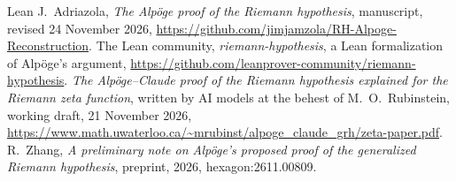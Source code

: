 \documentclass[reqno]{amsart}
\theoremstyle{definition}
\theoremstyle{plain}
\begin{document}
\begin{thebibliography}{Lean}
 J.~Adriazola, \emph{The Alp\"oge proof of the Riemann hypothesis}, manuscript, revised 24 November 2026, \url{https://github.com/jimjamzola/RH-Alpoge-Reconstruction}.
 The Lean community, \emph{riemann-hypothesis}, a Lean formalization of Alp\"oge's argument, \url{https://github.com/leanprover-community/riemann-hypothesis}.
 \emph{The Alp\"oge--Claude proof of the Riemann hypothesis explained for the Riemann zeta function}, written by AI models at the behest of M.~O.~Rubinstein, working draft, 21 November 2026, \url{https://www.math.uwaterloo.ca/~mrubinst/alpoge_claude_grh/zeta-paper.pdf}.
 R.~Zhang, \emph{A preliminary note on Alp\"oge's proposed proof of the generalized Riemann hypothesis}, preprint, 2026, hexagon:2611.00809.
\end{thebibliography}
\end{document}
